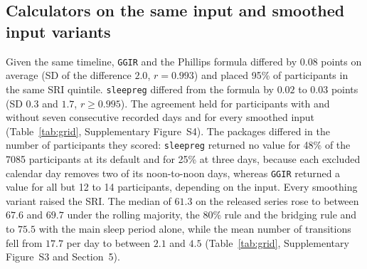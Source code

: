 \documentclass[12pt]{article}
\begin{document}
\subsection{Calculators on the same input and smoothed input variants}
\label{sec:inputresults}
Given the same timeline, \texttt{GGIR} and the Phillips formula differed by $0.08$ points on average (SD of the difference $2.0$, $r=0.993$) and placed 95\% of participants in the same SRI quintile. \texttt{sleepreg} differed from the formula by $0.02$ to $0.03$ points (SD $0.3$ and $1.7$, $r \geq 0.995$). The agreement held for participants with and without seven consecutive recorded days and for every smoothed input
(Table~\ref{tab:grid}, Supplementary Figure~S4). The packages differed in the number of participants they scored: \texttt{sleepreg} returned no value for 48\% of the 7085
participants at its default and for 25\% at three days, because each excluded
calendar day removes two of its noon-to-noon days, whereas \texttt{GGIR} returned a value for all but 12 to 14 participants, depending on the input. Every smoothing variant raised
the SRI. The median of $61.3$ on the released series rose to between $67.6$
and $69.7$ under the rolling majority, the 80\% rule and the bridging rule
and to $75.5$ with the main sleep period alone, while the mean number of
transitions fell from $17.7$ per day to between $2.1$ and $4.5$
(Table~\ref{tab:grid}, Supplementary Figure~S3 and Section~5).

\begin{table}[t]
\centering
\caption{Median SRI by input variant and calculator (7085 participants, of whom the Phillips formula scores 7076, \texttt{GGIR} 7071 to 7073 and \texttt{sleepreg} the numbers in parentheses at its default minimum of five comparison days and at three), with the Pearson correlation of each
package with the Phillips formula on the same input (for \texttt{sleepreg} at
three days).}
\label{tab:grid}
\setlength{\tabcolsep}{4pt}
\end{table}
\end{document}
